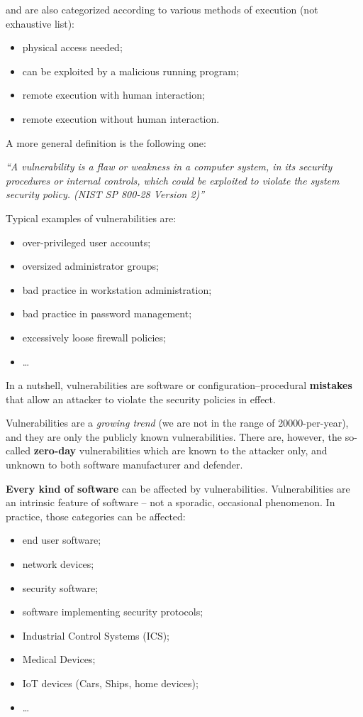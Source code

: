 \documentclass[10pt]{extbook}
\begin{document}
and are also categorized according to various methods of execution (not
exhaustive list):
\begin{itemize}
    \item physical access needed;
    \item can be exploited by a malicious running program;
    \item remote execution with human interaction;
    \item remote execution without human interaction.
\end{itemize}



A more general definition is the following one:

\vspace*{1cm}
\begin{center}
    \emph{``A vulnerability is a flaw or weakness in a computer system, in its
    security procedures or internal controls, which could be exploited to
violate the system security policy. (NIST SP 800-28 Version 2)''}
\end{center}
\vspace*{1cm}

Typical examples of vulnerabilities are:
\begin{itemize}
    \item over\--privileged user accounts;
    \item oversized administrator groups;
    \item bad practice in workstation administration;
    \item bad practice in password management;
    \item excessively loose firewall policies;
    \item \dots
\end{itemize}

In a nutshell, vulnerabilities are software or configuration\---procedural
\textbf{mistakes} that allow an attacker to violate the security policies in
effect.

Vulnerabilities are a \emph{growing trend} (we are not in the range of
20000\--per\--year), and they are only the publicly known vulnerabilities.
There are, however, the so\--called \textbf{zero\--day} vulnerabilities which
are known to the attacker only, and unknown to both software manufacturer and
defender.

\textbf{Every kind of software} can be affected by vulnerabilities.
Vulnerabilities are an intrinsic feature of software -- not a sporadic,
occasional phenomenon. In practice, those categories can be affected:
\begin{itemize}
    \item end user software;
    \item network devices;
    \item security software;
    \item software implementing security protocols;
    \item Industrial Control Systems (ICS);
    \item Medical Devices;
    \item IoT devices (Cars, Ships, home devices);
    \item \dots
\end{itemize}
\end{document}

